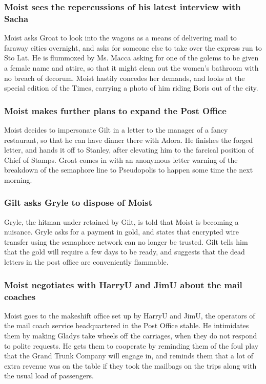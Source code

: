 \subsubsection{\Gls{Moist} sees the repercussions of his latest interview with \Gls{Sacha}}
\Gls{Moist} asks \Gls{Groat} to look into the wagons as a means of delivering mail to faraway
cities overnight, and asks for someone else to take over the express run to Sto Lat. He is
flummoxed by Ms. \Gls{Macca} asking for one of the golems to be given a female name and attire, so
that it might clean out the women's bathroom with no breach of decorum. \Gls{Moist} hastily concedes
her demands, and looks at the special edition of the Times, carrying a photo of him riding
\Gls{Boris} out of the city.

\subsubsection{\Gls{Moist} makes further plans to expand the Post Office}
\Gls{Moist} decides to impersonate \Gls{Gilt} in a letter to the manager of a fancy restaurant, so
that he can have dinner there with \Gls{Adora}. He finishes the forged letter, and hands it off to
\Gls{Stanley}, after elevating him to the farcical position of Chief of Stamps. \Gls{Groat} comes
in with an anonymous letter warning of the breakdown of the semaphore line to Pseudopolis to happen
some time the next morning.

\subsubsection{\Gls{Gilt} asks \Gls{Gryle} to dispose of \Gls{Moist}}
\Gls{Gryle}, the hitman under retained by \Gls{Gilt}, is told that \Gls{Moist} is becoming a
nuisance. \Gls{Gryle} asks for a payment in gold, and states that encrypted wire transfer using
the semaphore network can no longer be trusted. \Gls{Gilt} tells him that the gold will require a
few days to be ready, and suggests that the dead letters in the post office are conveniently
flammable.

\subsubsection{\Gls{Moist} negotiates with \Gls{HarryU} and \Gls{JimU} about the mail coaches}
\Gls{Moist} goes to the makeshift office set up by \Gls{HarryU} and \Gls{JimU}, the operators of the
mail coach service headquartered in the Post Office stable. He intimidates them by making
\Gls{Gladys} take wheels off the carriages, when they do not respond to polite requests. He gets
them to cooperate by reminding them of the foul play that the Grand Trunk Company will engage in,
and reminds them that a lot of extra revenue was on the table if they took the mailbags on the trips
along with the usual load of passengers.

